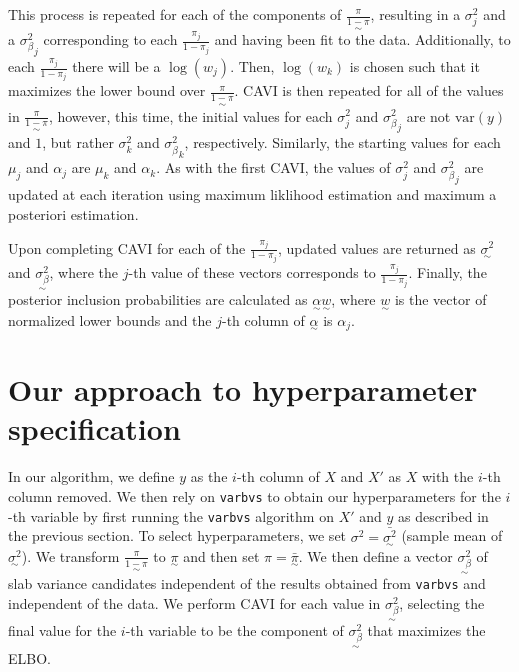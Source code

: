 \documentclass[twoside]{article}
\newcommand{\1}{\\[1ex]}
\newcommand{\2}{\\[2ex]}
\newcommand{\3}{\\[3ex]}
\newcommand{\4}{\\[4ex]}
\begin{document}
This process is repeated for each of the components of $\underset{\sim}{\frac{\pi}{1 - \pi}}$, resulting in a $\sigma^2_j$ and a ${\sigma^2_\beta}_j$ corresponding to each ${\frac{\pi_j}{1 - \pi_j}}$ and having been fit to the data. Additionally, to each $\frac{\pi_j}{1-\pi_j}$ there will be a $\log(w_j)$. Then, $\log(w_k)$ is chosen such that it maximizes the lower bound over $\underset\sim{\frac{\pi}{1-\pi}}$. CAVI is then repeated for all of the values in $\underset{\sim}{\frac{\pi}{1 - \pi}}$, however, this time, the initial values for each $\sigma^2_j$ and ${\sigma^2_\beta}_j$ are not $\text{var}(y)$ and $1$, but rather $\sigma^2_k$ and ${\sigma^2_\beta}_k$, respectively. Similarly, the starting values for each $\mu_j$ and $\alpha_j$ are $\mu_k$ and $\alpha_k$. 
As with the first CAVI, the values of $\sigma^2_j$ and ${\sigma^2_\beta}_j$ are updated at each iteration using maximum liklihood estimation and maximum a posteriori estimation. 

Upon completing CAVI for each of the $\frac{\pi_j}{1 - \pi_j}$, updated values are returned as $\underset{\sim}{\sigma^2}$ and $\underset{\sim}{\sigma^2_\beta}$, where the $j$-th value of these vectors corresponds to $\frac{\pi_j}{1 - \pi_j}$. Finally, the posterior inclusion probabilities are calculated as $\underset\sim\alpha\underset\sim w$, where $\underset\sim w$ is the vector of normalized lower bounds and the $j$-th column of $\underset\sim\alpha$ is $\alpha_j$.

\section{Our approach to hyperparameter specification}

In our algorithm, we define $y$ as the $i$-th column of $X$ and $X'$ as $X$ with the $i$-th column removed. We then rely on \texttt{varbvs} to obtain our hyperparameters for the $i$-th variable by first running the \texttt{varbvs} algorithm on $X'$ and $y$ as described in the previous section. To select hyperparameters, we set $\sigma^2 = \bar{\underset\sim{\sigma^2}}$ (sample mean of $\underset\sim{\sigma^2}$). We transform $\underset\sim{\frac\pi{1-\pi}}$ to $\underset\sim\pi$ and then set $\pi = \bar{\underset\sim\pi}$. We then define a vector $\underset\sim{\sigma_\beta^2}$ of slab variance candidates independent of the results obtained from \texttt{varbvs} and independent of the data. We perform CAVI for each value in $\underset\sim{\sigma_\beta^2}$, selecting the final value for the $i$-th variable to be the component of $\underset\sim{\sigma^2_\beta}$ that maximizes the ELBO. 
\end{document}
